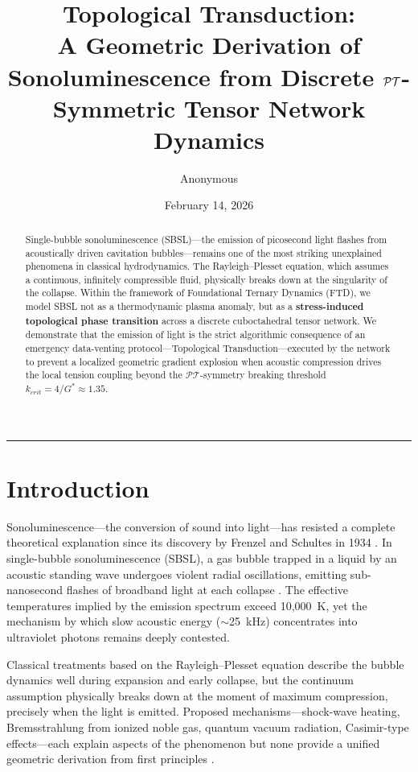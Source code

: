 \documentclass[11pt, letterpaper]{article}
\title{\vspace{-3em}\textbf{Topological Transduction:\\ \large A Geometric Derivation of Sonoluminescence from Discrete $\PT$-Symmetric Tensor Network Dynamics}}
\author[1]{Anonymous}
\affil[1]{\textit{Foundational Ternary Dynamics Research}}
\date{February 14, 2026}
\newcommand{\G}{G^*}
\newcommand{\PT}{\mathcal{PT}}
\theoremstyle{definition}
\theoremstyle{remark}
\begin{document}
\maketitle

\begin{abstract}
Single-bubble sonoluminescence (SBSL)---the emission of picosecond light flashes from acoustically driven cavitation bubbles---remains one of the most striking unexplained phenomena in classical hydrodynamics. The Rayleigh--Plesset equation, which assumes a continuous, infinitely compressible fluid, physically breaks down at the singularity of the collapse. Within the framework of Foundational Ternary Dynamics (FTD), we model SBSL not as a thermodynamic plasma anomaly, but as a \textbf{stress-induced topological phase transition} across a discrete cuboctahedral tensor network. We demonstrate that the emission of light is the strict algorithmic consequence of an emergency data-venting protocol---Topological Transduction---executed by the network to prevent a localized geometric gradient explosion when acoustic compression drives the local tension coupling beyond the $\PT$-symmetry breaking threshold $k_{crit} = 4/\G \approx 1.35$.
\end{abstract}

\vspace{1em}
\hrule
\vspace{1.5em}

\section{Introduction}

Sonoluminescence---the conversion of sound into light---has resisted a complete theoretical explanation since its discovery by Frenzel and Schultes in 1934 \cite{Frenzel1934}. In single-bubble sonoluminescence (SBSL), a gas bubble trapped in a liquid by an acoustic standing wave undergoes violent radial oscillations, emitting sub-nanosecond flashes of broadband light at each collapse \cite{Gaitan1992, Barber1997}. The effective temperatures implied by the emission spectrum exceed 10,000~K, yet the mechanism by which slow acoustic energy ($\sim$25~kHz) concentrates into ultraviolet photons remains deeply contested.

Classical treatments based on the Rayleigh--Plesset equation \cite{RayleighPlesset} describe the bubble dynamics well during expansion and early collapse, but the continuum assumption physically breaks down at the moment of maximum compression, precisely when the light is emitted. Proposed mechanisms---shock-wave heating, Bremsstrahlung from ionized noble gas, quantum vacuum radiation, Casimir-type effects---each explain aspects of the phenomenon but none provide a unified geometric derivation from first principles \cite{Brenner2002}.
\end{document}
